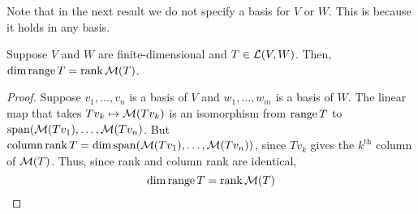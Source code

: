 Note that in the next result we do not specify a basis for $V$ or $W$. This is because it holds in any basis.
\begin{theorem}[$\dim \range T = \rank \matr(T)$]
    Suppose $V$ and $W$  are finite-dimensional and $T\in\mathcal{L}(V,W)$. Then, $\dim\range T = \rank\matr(T)$.
\end{theorem}
\begin{proof}
    Suppose $v_1, \dots, v_n$ is a basis of $V$ and $w_1, \dots, w_m$ is a basis of $W$. The linear map that takes $Tv_k \mapsto \mathcal{M}(Tv_k)$ is an isomorphism from $\operatorname{range} T$ to $\operatorname{span}(\mathcal{M}(Tv_1), \dots, \mathcal{M}(Tv_n)$. But $\operatorname{column} \operatorname{rank} T = \dim\operatorname{span}(\mathcal{M}(Tv_1), \dots, \mathcal{M}(Tv_n))$, since $Tv_k$ gives the $k^\text{th}$ column of $\mathcal{M}(T)$. Thus, since rank and column rank are identical,
    \[ \dim \operatorname{range} T = \rank \mathcal{M} (T)\]
\end{proof}
